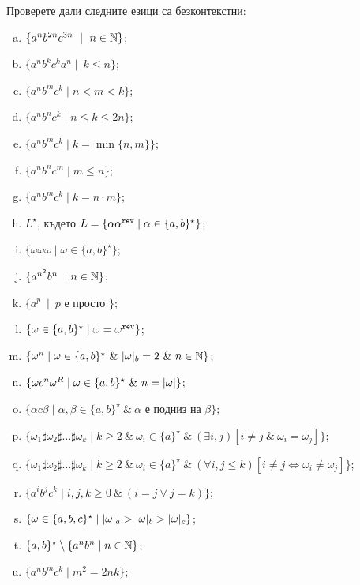 \begin{extra}
\begin{problem}
  Проверете дали следните езици са безконтекстни:
  \begin{enumerate}[a)]
  \item
    $\{a^nb^{2n}c^{3n}\ \mid\ n\in\Nat\}$;
  \item
    $\{a^nb^kc^ka^n\mid\ k \leq n\}$;
  \item
    $\{a^nb^mc^k\mid n < m < k\}$;
  \item
    $\{a^nb^nc^k\mid n \leq k \leq 2n\}$;
  \item
    $\{a^nb^mc^k\mid k = \min\{n,m\}\}$;
  \item
    $\{a^nb^nc^m\mid m \leq n\}$;
  \item
    $\{a^nb^mc^k\mid k = n\cdot m\}$;
  \item
    $L^\star$, където
    $L = \{\alpha\alpha^{\texttt{rev}} \mid \alpha \in \{a,b\}^\star\}$;
  \item
    $\{\omega\omega\omega\mid \omega\in \{a,b\}^\star\}$;
  \item
    $\{a^{n^2}b^n\ \mid n \in \mathbb{N}\}$;
  \item
    $\{a^p\ \mid\ p\mbox{ е просто }\}$;
  \item
    $\{\omega \in \{a,b\}^\star \mid \omega = \omega^{\texttt{rev}}\}$;
  \item
    $\{\omega^n \mid \omega \in \{a,b\}^\star\ \&\ \vert{\omega}\vert_{b} = 2\ \&\ n \in \mathbb{N}\}$;
  \item
    $\{\omega c^n \omega^R \mid \omega \in \{a,b\}^\star\ \&\ n = \vert{\omega}\vert\}$;
  \item
    $\{\alpha c \beta \mid \alpha,\beta \in \{a,b\}^\star\ \&\ \alpha\mbox{ е подниз на }\beta\}$;
  \item
    $\{\omega_1 \sharp \omega_2 \sharp \dots \sharp \omega_k\mid k\geq 2\ \&\ \omega_i\in \{a\}^\star\ \&\ (\exists i,j)[i \neq j\ \&\ \omega_i = \omega_j]\}$;
  \item
    $\{\omega_1 \sharp \omega_2 \sharp \dots \sharp \omega_k\mid k\geq 2\ \&\ \omega_i\in \{a\}^\star\ \&\ (\forall i,j \leq k)[i \neq j \iff \omega_i \neq \omega_j]\}$;
  \item
    $\{a^ib^jc^k\mid i,j,k\geq 0\ \&\ (i = j \vee j = k)\}$;
  \item
    $\{\omega \in \{a,b,c\}^\star\mid \vert{\omega}\vert_{a} > \vert{\omega}\vert_{b} > \vert{\omega}\vert_{c}\}$;
  \item
    $\{a,b\}^\star \setminus \{a^nb^n\mid n\in \mathbb{N}\}$;
  \item
    $\{a^nb^mc^k \mid m^2 = 2nk\}$;


\end{enumerate}
\end{problem}
\end{extra}
